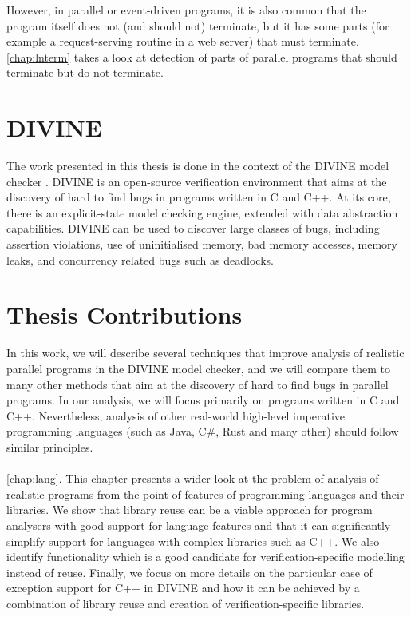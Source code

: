 However, in parallel or event-driven programs, it is also common that the program itself does
not (and should not) terminate, but it has some parts (for example a
request-serving routine in a web server) that must terminate.
\autoref{chap:lnterm} takes a look at detection of parts of parallel programs that should terminate but do not terminate.

\section{DIVINE}

The work presented in this thesis is done in the context of the DIVINE model checker .
DIVINE is an open-source verification environment that aims at the discovery of hard to find bugs in programs written in C and C++.
At its core, there is an explicit-state model checking engine, extended with data abstraction capabilities.
DIVINE can be used to discover large classes of bugs, including assertion violations, use of uninitialised memory, bad memory accesses, memory leaks, and concurrency related bugs such as deadlocks.


\section{Thesis Contributions}

In this work, we will describe several techniques that improve analysis of realistic parallel programs in the DIVINE model checker, and we will compare them to many other methods that aim at the discovery of hard to find bugs in parallel programs.
In our analysis, we will focus primarily on programs written in C and C++.
Nevertheless, analysis of other real-world high-level imperative programming
languages (such as Java, C\#, Rust and many other) should follow similar
principles.

\paragraph{}
\autoref{chap:lang}.
This chapter presents a wider look at the problem of analysis of realistic
programs from the point of features of programming languages and their libraries.
We show that library reuse can be a viable approach for program analysers with
good support for language features and that it can significantly simplify
support for languages with complex libraries such as C++.
We also identify functionality which is a good candidate for
verification-specific modelling instead of reuse.
Finally, we focus on more details on the particular case of exception support
for C++ in DIVINE and how it can be achieved by a combination of library reuse
and creation of verification-specific libraries.


